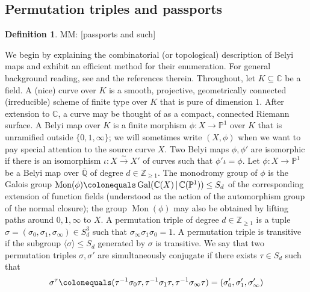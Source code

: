 \documentclass{dcthesis}
\newcommand{\PP}{\mathbb P}
\newcommand{\CC}{\mathbb C}
\newcommand{\QQ}{\mathbb Q}
\newcommand{\ZZ}{\mathbb Z}
\newcommand{\defi}[1]{\textsf{#1}}
\newcommand{\mm}[1]{{\color{blue} \sf MM: [#1]}}
\DeclareMathOperator{\Mon}{Mon}
\DeclareMathOperator{\Gal}{Gal}
\theoremstyle{definition}
\newtheorem{definition}[prop]{Definition}
\theoremstyle{remark}
\numberwithin{equation}{section}
\numberwithin{figure}{section}
\begin{document}
{{    \subsection{Permutation triples and passports}{\label{subsec:passports}
      \begin{definition}\label{def:passport}
        \mm{passports and such}
      \end{definition}
      We begin by explaining the combinatorial (or topological)
      description of Belyi maps and exhibit
      an efficient method for their enumeration.
      For general background reading,
      see \cite[\S 1]{SV} and the references therein.
      Throughout, let $K \subseteq \CC$ be a field.  A \defi{(nice) curve} over $K$ is
      a smooth, projective, geometrically connected (irreducible) scheme of finite
      type over $K$ that is pure of dimension $1$. After extension to $\CC$, a curve
      may be thought of as a compact, connected Riemann surface.  A \defi{Belyi map}
      over $K$ is a finite morphism $\phi\colon X \to \PP^1$ over $K$ that is
      unramified outside $\{0,1,\infty\}$; we will sometimes write $(X,\phi)$ when we
      want to pay special attention to the source curve $X$.  Two Belyi maps
      $\phi,\phi'$ are \defi{isomorphic} if there is an isomorphism $\iota\colon X
      \xrightarrow{\sim} X'$ of curves such that $\phi'\iota=\phi$.
      Let $\phi\colon X\to\PP^1$ be a Belyi map over $\overline{\QQ}$ of degree
      $d \in \ZZ_{\geq 1}$.
      The \defi{monodromy group} of $\phi$ is the Galois group
      $\Mon(\phi) \colonequals \Gal(\CC(X)\,|\,\CC(\PP^1)) \leq S_d$ of the
      corresponding extension of function fields (understood as the action of the
      automorphism group of the normal closure); the group $\Mon(\phi)$ may also be
      obtained by lifting paths around $0,1,\infty$ to $X$.
      A \defi{permutation triple} of degree $d \in \ZZ_{\geq 1}$ is a tuple $\sigma =
      (\sigma_0,\sigma_1,\sigma_\infty)\in S_d^3$ such that $\sigma_\infty \sigma_1
      \sigma_0 = 1$. A permutation triple is \defi{transitive} if the subgroup
      $\langle \sigma \rangle \leq S_d$ generated by $\sigma$ is transitive.  We say
      that two permutation triples $\sigma,\sigma'$ are \defi{simultaneously
      conjugate} if there exists $\tau\in S_d$ such that
      \begin{equation}\label{eqn:simconj}
        \sigma^\tau \colonequals
        (\tau^{-1}\sigma_0\tau, \tau^{-1}\sigma_1\tau, \tau^{-1}\sigma_\infty\tau)
        = \left(\sigma'_0,\sigma'_1,\sigma'_\infty\right)

\end{equation}}}}
\end{document}
